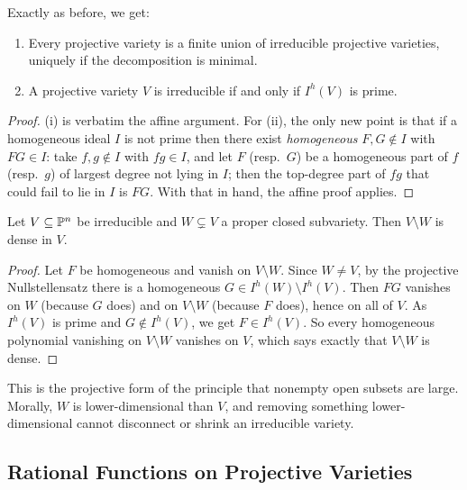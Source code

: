 \documentclass[a4paper]{scrartcl}
\begin{document}
Exactly as before, we get:

\begin{proposition}
	\begin{enumerate}[label=(\roman*)]
		\item Every projective variety is a finite union of irreducible projective varieties, uniquely if the decomposition is minimal.
		\item A projective variety $V$ is irreducible if and only if $I^h(V)$ is prime.
	\end{enumerate}
\end{proposition}

\begin{proof}
	(i) is verbatim the affine argument. For (ii), the only new point is that if a homogeneous ideal $I$ is not prime then there exist \emph{homogeneous} $F, G \notin I$ with $FG \in I$: take $f,g \notin I$ with $fg \in I$, and let $F$ (resp.\ $G$) be a homogeneous part of $f$ (resp.\ $g$) of largest degree not lying in $I$; then the top-degree part of $fg$ that could fail to lie in $I$ is $FG$. With that in hand, the affine proof applies.
\end{proof}

\begin{proposition}\label{prop:opendense}
	Let $V \subseteq \mathbb{P}^n$ be irreducible and $W \subsetneq V$ a proper closed subvariety. Then $V \setminus W$ is dense in $V$.
\end{proposition}

\begin{proof}
	Let $F$ be homogeneous and vanish on $V \setminus W$. Since $W \neq V$, by the projective Nullstellensatz there is a homogeneous $G \in I^h(W) \setminus I^h(V)$. Then $FG$ vanishes on $W$ (because $G$ does) and on $V \setminus W$ (because $F$ does), hence on all of $V$. As $I^h(V)$ is prime and $G \notin I^h(V)$, we get $F \in I^h(V)$. So every homogeneous polynomial vanishing on $V\setminus W$ vanishes on $V$, which says exactly that $V \setminus W$ is dense.
\end{proof}

This is the projective form of the principle that nonempty open subsets are large. Morally, $W$ is lower-dimensional than $V$, and removing something lower-dimensional cannot disconnect or shrink an irreducible variety.

\subsection{Rational Functions on Projective Varieties}
\end{document}
